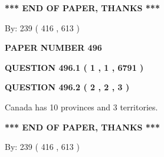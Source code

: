 \documentclass[12pt]{article}
\begin{document}
   
   
   
   
\vspace{1.0in} 
{\textbf{\large{ *** END OF PAPER, THANKS *** }}} 
   
   
\hspace{1.0in} By: 
 239 ( 416 ,  613 )
   
   
   
   
\newpage 
\setcounter{page}{ 
   496001 } 
   
   
   
   
 {\textbf{ \Large{ PAPER NUMBER  496  }}}
   
   
\vspace{0.2in}
   
   
   
   
   
   
 \vspace{0.2in}
 
 
 
 
   
   
  
\vspace{0.2in}
  
{\textbf{\Large{QUESTION
496.1 
 ( 1 , 1 , 6791 )
}}}
  
  
  
\vspace{0.2in}
  
{\textbf{\Large{QUESTION
496.2 
 ( 2 , 2 , 3 )
}}}
  
  
 
 
\noindent{}
 
 
Canada has 10  provinces and 3 territories.
 
 
 
 
   
   
 \vspace{0.2in}
 
   
   
   
   
\vspace{1.0in} 
{\textbf{\large{ *** END OF PAPER, THANKS *** }}} 
   
   
\hspace{1.0in} By: 
 239 ( 416 ,  613 )
   
   
   
   
\newpage 
\setcounter{page}{ 
   497001 } 
   
\end{document}

